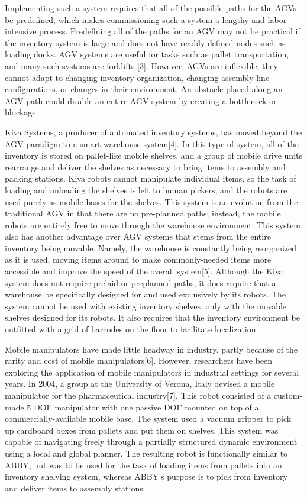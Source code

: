 \documentclass[]{cwru} %
\begin{document}
Implementing such a system requires that all of the possible paths for
the AGVs be predefined, which makes commissioning such a system a
lengthy and labor-intensive process. Predefining all of the paths for an
AGV may not be practical if the inventory system is large and does not
have readily-defined nodes such as loading docks. AGV systems are useful
for tasks such as pallet transportation, and many such systems are
forklifts {[}3{]}. However, AGVs are inflexible; they cannot adapt to
changing inventory organization, changing assembly line configurations,
or changes in their environment. An obstacle placed along an AGV path
could disable an entire AGV system by creating a bottleneck or blockage.

Kiva Systems, a producer of automated inventory systems, has moved
beyond the AGV paradigm to a smart-warehouse system{[}4{]}. In this type
of system, all of the inventory is stored on pallet-like mobile shelves,
and a group of mobile drive units rearrange and deliver the shelves as
necessary to bring items to assembly and packing stations. Kiva robots
cannot manipulate individual items, so the task of loading and unloading
the shelves is left to human pickers, and the robots are used purely as
mobile bases for the shelves. This system is an evolution from the
traditional AGV in that there are no pre-planned paths; instead, the
mobile robots are entirely free to move through the warehouse
environment. This system also has another advantage over AGV systems
that stems from the entire inventory being movable. Namely, the
warehouse is constantly being reorganized as it is used, moving items
around to make commonly-needed items more accessible and improve the
speed of the overall system{[}5{]}. Although the Kiva system does not
require prelaid or preplanned paths, it does require that a warehouse be
specifically designed for and used exclusively by its robots. The system
cannot be used with existing inventory shelves, only with the movable
shelves designed for its robots. It also requires that the inventory
environment be outfitted with a grid of barcodes on the floor to
facilitate localization.

Mobile manipulators have made little headway in industry, partly because
of the rarity and cost of mobile manipulators{[}6{]}. However,
researchers have been exploring the application of mobile manipulators
in industrial settings for several years. In 2004, a group at the
University of Verona, Italy devised a mobile manipulator for the
pharmaceutical industry{[}7{]}. This robot consisted of a custom-made 5
DOF manipulator with one passive DOF mounted on top of a
commercially-available mobile base. The system used a vacuum gripper to
pick up cardboard boxes from pallets and put them on shelves. This
system was capable of navigating freely through a partially structured
dynamic environment using a local and global planner. The resulting
robot is functionally similar to ABBY, but was to be used for the task
of loading items from pallets into an inventory shelving system, whereas
ABBY's purpose is to pick from inventory and deliver items to assembly
stations.
\end{document}
